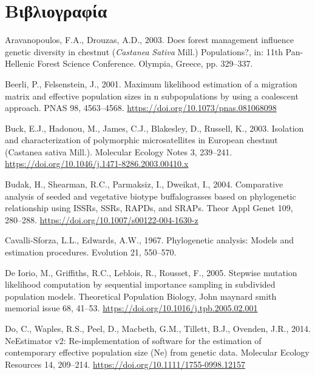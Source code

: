 \documentclass[12pt,a4paper,]{report}
\begin{document}
\section{Βιβλιογραφία}

\hypertarget{refs}{}
\leavevmode\hypertarget{ref-aravanopoulos_does_2003}{}%
Aravanopoulos, F.A., Drouzas, A.D., 2003. Does forest management
influence genetic diversity in chestnut (\emph{Castanea} \emph{Sativa}
Mill.) Populations?, in: 11th Pan-Hellenic Forest Science Conference.
Olympia, Greece, pp. 329--337.

\leavevmode\hypertarget{ref-beerli_maximum_2001}{}%
Beerli, P., Felsenstein, J., 2001. Maximum likelihood estimation of a
migration matrix and effective population sizes in n subpopulations by
using a coalescent approach. PNAS 98, 4563--4568.
\url{https://doi.org/10.1073/pnas.081068098}

\leavevmode\hypertarget{ref-buck_isolation_2003}{}%
Buck, E.J., Hadonou, M., James, C.J., Blakesley, D., Russell, K., 2003.
Isolation and characterization of polymorphic microsatellites in
European chestnut (Castanea sativa Mill.). Molecular Ecology Notes 3,
239--241. \url{https://doi.org/10.1046/j.1471-8286.2003.00410.x}

\leavevmode\hypertarget{ref-budak_comparative_2004}{}%
Budak, H., Shearman, R.C., Parmaksiz, I., Dweikat, I., 2004. Comparative
analysis of seeded and vegetative biotype buffalograsses based on
phylogenetic relationship using ISSRs, SSRs, RAPDs, and SRAPs. Theor
Appl Genet 109, 280--288.
\url{https://doi.org/10.1007/s00122-004-1630-z}

\leavevmode\hypertarget{ref-cavalli1967phylogenetic}{}%
Cavalli-Sforza, L.L., Edwards, A.W., 1967. Phylogenetic analysis: Models
and estimation procedures. Evolution 21, 550--570.

\leavevmode\hypertarget{ref-de_iorio_stepwise_2005}{}%
De Iorio, M., Griffiths, R.C., Leblois, R., Rousset, F., 2005. Stepwise
mutation likelihood computation by sequential importance sampling in
subdivided population models. Theoretical Population Biology, John
maynard smith memorial issue 68, 41--53.
\url{https://doi.org/10.1016/j.tpb.2005.02.001}

\leavevmode\hypertarget{ref-Do2014}{}%
Do, C., Waples, R.S., Peel, D., Macbeth, G.M., Tillett, B.J., Ovenden,
J.R., 2014. NeEstimator v2: Re-implementation of software for the
estimation of contemporary effective population size (Ne) from genetic
data. Molecular Ecology Resources 14, 209--214.
\url{https://doi.org/10.1111/1755-0998.12157}
\end{document}
